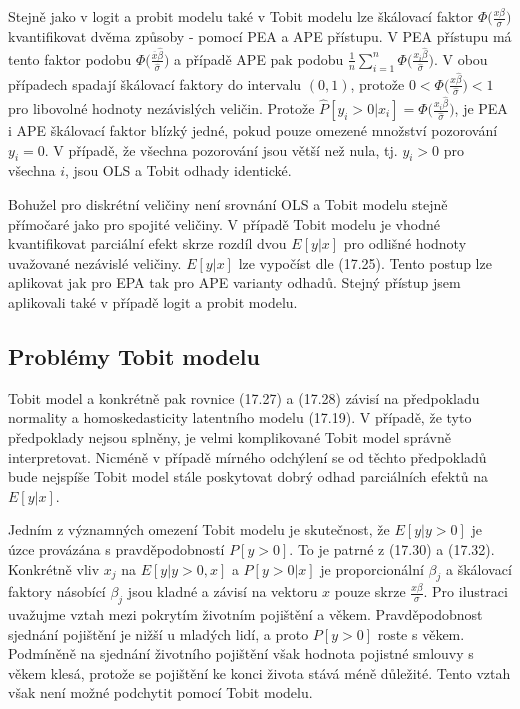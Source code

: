 Stejně jako v logit a probit modelu také v Tobit modelu lze škálovací faktor $\Phi\Big(\frac{x \beta}{\sigma}\Big)$ kvantifikovat dvěma způsoby - pomocí PEA a APE přístupu. V PEA přístupu má tento faktor podobu $\Phi\Big(\frac{\overline{x}\hat{\beta}}{\hat{\sigma}}\Big)$ a případě APE pak podobu $\frac{1}{n}\sum_{i = 1}^n \Phi\Big(\frac{x_i \hat{\beta}}{\hat{\sigma}}\Big)$. V obou případech spadají škálovací faktory do intervalu $(0, 1)$, protože $0 < \Phi\Big(\frac{x \hat{\beta}}{\hat{\sigma}}\Big) < 1$ pro libovolné hodnoty nezávislých veličin. Protože $\hat{P}[y_i > 0 | x_i] = \Phi\Big(\frac{x_i \hat{\beta}}{\hat{\sigma}}\Big)$, je PEA i APE škálovací faktor blízký jedné, pokud pouze omezené množství pozorování $y_i = 0$. V případě, že všechna pozorování jsou větší než nula, tj. $y_i > 0$ pro všechna $i$, jsou OLS a Tobit odhady identické.

Bohužel pro diskrétní veličiny není srovnání OLS a Tobit modelu stejně přímočaré jako pro spojité veličiny. V případě Tobit modelu je vhodné kvantifikovat parciální efekt skrze rozdíl dvou $E[y | x]$ pro odlišné hodnoty uvažované nezávislé veličiny. $E[y | x]$ lze vypočíst dle (17.25). Tento postup lze aplikovat jak pro EPA tak pro APE varianty odhadů. Stejný přístup jsem aplikovali také v případě logit a probit modelu.

\subsection{Problémy Tobit modelu}

Tobit model a konkrétně pak rovnice (17.27) a (17.28) závisí na předpokladu normality a homoskedasticity latentního modelu (17.19). V případě, že tyto předpoklady nejsou splněny, je velmi komplikované Tobit model správně interpretovat. Nicméně v případě mírného odchýlení se od těchto předpokladů bude nejspíše Tobit model stále poskytovat dobrý odhad parciálních efektů na $E[y|x]$.

Jedním z významných omezení Tobit modelu je skutečnost, že $E[y|y > 0]$ je úzce provázána s pravděpodobností $P[y > 0]$. To je patrné z (17.30) a (17.32). Konkrétně vliv $x_j$ na $E[y|y > 0, x]$ a $P[y > 0 | x]$ je proporcionální $\beta_j$ a škálovací faktory násobící $\beta_j$ jsou kladné a závisí na vektoru $x$ pouze skrze $\frac{x \beta}{\sigma}$. Pro ilustraci uvažujme  vztah mezi pokrytím životním pojištění a věkem. Pravděpodobnost sjednání pojištění je nižší u mladých lidí, a proto $P[y > 0]$ roste s věkem. Podmíněně na sjednání životního pojištění však hodnota pojistné smlouvy s věkem klesá, protože se pojištění ke konci života stává méně důležité. Tento vztah však není možné podchytit pomocí Tobit modelu.

